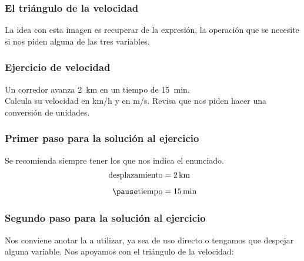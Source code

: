 \documentclass[14pt]{beamer}
\begin{document}
\begin{frame}
\frametitle{El triángulo de la velocidad}
\begin{figure}
\centering
{}
\end{figure}
La idea con esta imagen es recuperar de la expresión, la operación que se necesite si nos piden alguna de las tres variables.
\end{frame}
\begin{frame}
\frametitle{Ejercicio de velocidad}
Un corredor avanza \SI{2}{\kilo\meter} en un tiempo de \SI{15}{\minute}.
\\
\bigskip
\pause
Calcula su velocidad en \unit[per-mode=symbol]{\kilo\meter\per\hour} y en \unit[per-mode=symbol]{\meter\per\second}.
\pause
Revisa que nos piden hacer una conversión de unidades.
\end{frame}
\begin{frame}
\frametitle{Primer paso para la solución al ejercicio}
Se recomienda siempre tener los  que nos indica el enunciado.
\pause
\begin{eqnarray*}
\begin{aligned}
\text{desplazamiento} &= \SI{2}{\kilo\meter} \\[0.5em] \pause
\text{tiempo} &= \SI{15}{\minute}
\end{aligned}
\end{eqnarray*}
\end{frame}
\begin{frame}
\frametitle{Segundo paso para la solución al ejercicio}
Nos conviene anotar la  a utilizar, ya sea de uso directo o tengamos que despejar alguna variable. \pause Nos apoyamos con el triángulo de la velocidad:
\pause
\begin{figure}
\centering
{}
\end{figure}        
\end{frame}
\end{document}

